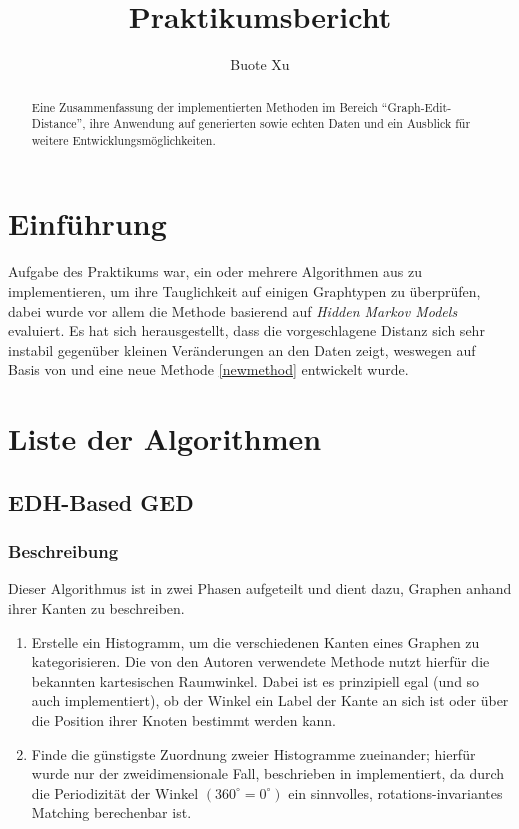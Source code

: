 \documentclass{DEarticle}
\title{Praktikumsbericht}
\author{Buote Xu}
\begin{document}
\maketitle
\begin{abstract}
Eine Zusammenfassung der implementierten Methoden im Bereich ``Graph-Edit-Distance'', 
ihre Anwendung auf generierten sowie echten Daten und 
ein Ausblick für weitere Entwicklungsmöglichkeiten.
\end{abstract}

\section{Einführung}
Aufgabe des Praktikums war, ein oder mehrere Algorithmen aus \cite{comp} zu implementieren, um ihre Tauglichkeit auf
einigen Graphtypen zu überprüfen, dabei wurde vor allem die Methode basierend auf \emph{Hidden Markov Models} evaluiert.
Es hat sich herausgestellt, dass die vorgeschlagene Distanz sich sehr instabil gegenüber kleinen
Veränderungen an den Daten zeigt, weswegen auf Basis von \cite{unscented} und \cite{randomwalk} eine neue
Methode \ref{newmethod} entwickelt wurde.


\section{Liste der Algorithmen}
\subsection{EDH-Based GED}
\subsubsection{Beschreibung}
\cite[EDH-Based GED]{comp}
Dieser Algorithmus ist in zwei Phasen aufgeteilt und dient dazu, Graphen anhand ihrer Kanten zu beschreiben.
\begin{enumerate}
\item Erstelle ein Histogramm, um die verschiedenen Kanten eines Graphen zu kategorisieren. Die von den Autoren
verwendete Methode nutzt hierfür die bekannten kartesischen Raumwinkel. Dabei ist es prinzipiell egal (und so auch
implementiert), ob der Winkel ein Label der Kante an sich ist oder über die Position ihrer Knoten bestimmt werden kann.
\item Finde die günstigste Zuordnung zweier Histogramme zueinander; hierfür wurde nur der zweidimensionale Fall,
beschrieben in
\cite[Appendix A]{sift}
implementiert, da durch die Periodizität der Winkel $(360^{\circ} = 0^{\circ})$ ein sinnvolles, rotations-invariantes
Matching berechenbar ist.
\end{enumerate}
\end{document}
